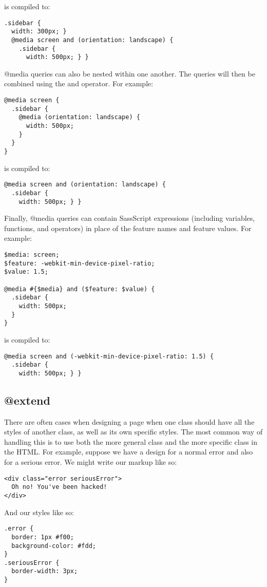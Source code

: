 \documentclass[10pt]{article}
\begin{document}
 is compiled to:
\begin{verbatim}
.sidebar {
  width: 300px; }
  @media screen and (orientation: landscape) {
    .sidebar {
      width: 500px; } }
\end{verbatim}


 @media queries can also be nested within one another. The queries will then be combined using the and operator. For example:
\begin{verbatim}
@media screen {
  .sidebar {
    @media (orientation: landscape) {
      width: 500px;
    }
  }
}
\end{verbatim}


 is compiled to:
\begin{verbatim}
@media screen and (orientation: landscape) {
  .sidebar {
    width: 500px; } }
\end{verbatim}


 Finally, @media queries can contain SassScript expressions (including variables, functions, and operators) in place of the feature names and feature values. For example:
\begin{verbatim}
$media: screen;
$feature: -webkit-min-device-pixel-ratio;
$value: 1.5;

@media #{$media} and ($feature: $value) {
  .sidebar {
    width: 500px;
  }
}
\end{verbatim}


 is compiled to:
\begin{verbatim}
@media screen and (-webkit-min-device-pixel-ratio: 1.5) {
  .sidebar {
    width: 500px; } }
\end{verbatim}
\subsection{@extend}


 There are often cases when designing a page when one class should have all the styles of another class, as well as its own specific styles. The most common way of handling this is to use both the more general class and the more specific class in the HTML. For example, suppose we have a design for a normal error and also for a serious error. We might write our markup like so:
\begin{verbatim}
<div class="error seriousError">
  Oh no! You've been hacked!
</div>
\end{verbatim}


 And our styles like so:
\begin{verbatim}
.error {
  border: 1px #f00;
  background-color: #fdd;
}
.seriousError {
  border-width: 3px;
}
\end{verbatim}
\end{document}
